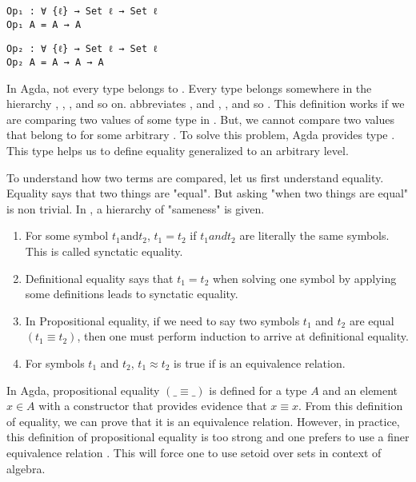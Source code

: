 \begin{verbatim}
Op₁ : ∀ {ℓ} → Set ℓ → Set ℓ
Op₁ A = A → A
\end{verbatim}
\begin{verbatim}
Op₂ : ∀ {ℓ} → Set ℓ → Set ℓ
Op₂ A = A → A → A
\end{verbatim}

In Agda, not every type belongs to . Every type belongs somewhere in
the hierarchy , , , and so on.
 abbreviates , and , , and so  \cite{plfa22.08}. This definition works if we are comparing two
values of some type in . But, we cannot compare two values that
belong to  for some arbitrary . To solve this problem,
Agda provides type . This type helps us to define equality
generalized to an arbitrary level.

To understand how two terms are compared, let us first understand equality.
Equality says that two things are "equal". But asking "when two things are
equal" is non trivial. In \cite{musa}, a hierarchy of "sameness" is given.
\begin{enumerate}
  \item For some symbol $t_1 \text{and} t_2$, $t_1 = t_2$ if $t_1 and t_2$ are
literally the same symbols. This is called synctatic equality.
  \item Definitional equality says that $t_1 = t_2$ when solving one symbol by
  applying some definitions leads to synctatic equality.
  \item In Propositional equality, if we need to say two symbols $t_1$ and $t_2$
  are equal $(t_1 \equiv t_2)$, then one must perform induction to arrive at
  definitional equality.
  \item For symbols $t_1$ and $t_2$, $t_1 \approx t_2$ is true if  is
  an equivalence relation.
\end{enumerate}  

In Agda, propositional equality $(\_ \equiv\_ )$ is defined for a type $A$ and an
element $x \in A$ with a constructor  that provides evidence that
$x \equiv x$. From this definition of equality, we can prove that it is an
equivalence relation. However, in practice, this definition of propositional
equality is too strong and one prefers to use a finer equivalence relation
\cite{musa}. This will force one to use setoid over sets in context of
algebra.

